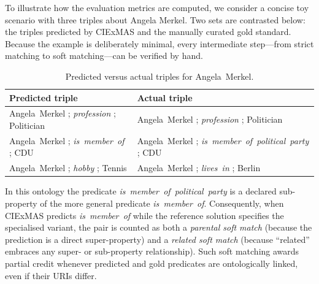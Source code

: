 \documentclass[a4paper,oneside,bibliography=totoc]{scrbook}
\begin{document}
To illustrate how the evaluation metrics are computed, we consider a concise toy scenario with three triples about Angela Merkel.  Two sets are contrasted below: the triples predicted by CIExMAS and the manually curated gold standard.  Because the example is deliberately minimal, every intermediate step—from strict matching to soft matching—can be verified by hand.

\begin{table}[ht]
  \centering
  \label{tab:merkel_triples}
  \begin{tabular}{p{}p{}}
    \toprule
    \textbf{Predicted triple} & \textbf{Actual triple}                                      \\ \midrule
    Angela~Merkel ; \textit{profession} ; Politician
                              & Angela~Merkel ; \textit{profession} ; Politician            \\[0.2em]
    Angela~Merkel ; \textit{is~member~of} ; CDU
                              & Angela~Merkel ; \textit{is~member~of~political~party} ; CDU \\[0.2em]
    Angela~Merkel ; \textit{hobby} ; Tennis
                              & Angela~Merkel ; \textit{lives~in} ; Berlin                  \\
    \bottomrule
  \end{tabular}
  \caption{Predicted versus actual triples for Angela~Merkel.}
\end{table}

In this ontology the predicate \textit{is~member~of~political~party} is a declared sub-property of the more general predicate \textit{is~member~of}.  Consequently, when CIExMAS predicts \textit{is~member~of} while the reference solution specifies the specialised variant, the pair is counted as both a \emph{parental soft match} (because the prediction is a direct super-property) and a \emph{related soft match} (because “related” embraces any super- or sub-property relationship).  Such soft matching awards partial credit whenever predicted and gold predicates are ontologically linked, even if their URIs differ.
\end{document}

